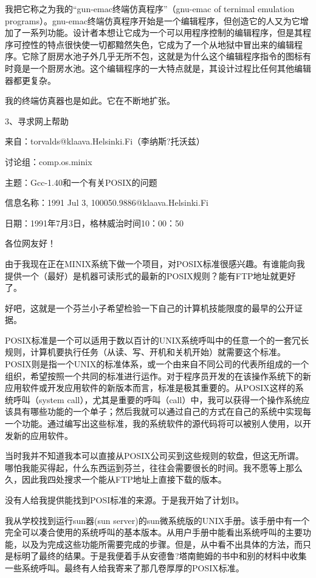 我把它称之为我的“gun-emac终端仿真程序”（gnu-emac of ternimal emulation programs）。gnu-emac终端仿真程序开始是一个编辑程序，但创造它的人又为它增加了一系列功能。设计者本想让它成为一个可以用程序控制的编辑程序，但是其程序可控性的特点很快使一切都黯然失色，它成为了一个从地狱中冒出来的编辑程序。它除了厨房水池子外几乎无所不包，这就是为什么这个编辑程序指令的图标有时竟是一个厨房水池。这个编辑程序的一大特点就是，其设计过程比任何其他编辑器都更复杂。

我的终端仿真器也是如此。它在不断地扩张。

 
3、寻求网上帮助

来自：torvalds@klaava.Helsinki.Fi（李纳斯?托沃兹）

讨论组：comp.os.minix

主题：Gcc-1.40和一个有关POSIX的问题

信息名称：1991 Jul 3, 100050.9886@klaava.Helsinki.Fi

日期：1991年7月3日，格林威治时间10：00：50

各位网友好！

由于我现在正在MINIX系统下做一个项目，对POSIX标准很感兴趣。有谁能向我提供一个（最好）是机器可读形式的最新的POSIX规则？能有FTP地址就更好了。

 

好吧，这就是一个芬兰小子希望检验一下自己的计算机技能限度的最早的公开证据。

POSIX标准是一个可以适用于数以百计的UNIX系统呼叫中的任意一个的一套冗长规则，计算机要执行任务（从读、写、开机和关机开始）就需要这个标准。POSIX则是指一个UNIX的标准体系，或一个由来自不同公司的代表所组成的一个组织，希望按照一个共同的标准进行运作。对于程序员开发的在该操作系统下的新应用软件或开发应用软件的新版本而言，标准是极其重要的。从POSIX这样的系统呼叫（system call），尤其是重要的呼叫（call）中，我可以获得一个操作系统应该具有哪些功能的一个单子；然后我就可以通过自己的方式在自己的系统中实现每一个功能。通过编写出这些标准，我的系统软件的源代码将可以被别人使用，以开发新的应用软件。

当时我并不知道我本可以直接从POSIX公司买到这些规则的软盘，但这无所谓。哪怕我能买得起，什么东西运到芬兰，往往会需要很长的时间。我不愿等上那么久，因此我四处搜求一个能从FTP地址上直接下载的版本。

没有人给我提供能找到POSI标准的来源。于是我开始了计划B。

我从学校找到运行sun器(sun server)的sun微系统版的UNIX手册。该手册中有一个完全可以凑合使用的系统呼叫的基本版本。从用户手册中能看出系统呼叫的主要功能，以及为完成这些功能所需要完成的步骤。但是，从中看不出具体的方法，而只是标明了最终的结果。于是我便着手从安德鲁?塔南鲍姆的书中和别的材料中收集一些系统呼叫。最终有人给我寄来了那几卷厚厚的POSIX标准。

